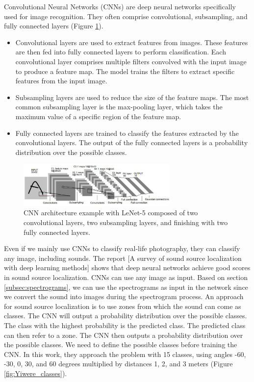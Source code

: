 Convolutional Neural Networks (CNNs)\cite{oshea2015introduction} are deep neural networks specifically used for image recognition. They often comprise convolutional, subsampling, and fully connected layers (Figure \ref*{fig:cnn_example}).
\begin{itemize}
    \item{} Convolutional layers are used to extract features from images. These features are then fed into fully connected layers to perform classification. Each convolutional layer comprises multiple filters convolved with the input image to produce a feature map. The model trains the filters to extract specific features from the input image.
    \item{} Subsampling layers are used to reduce the size of the feature maps. The most common subsampling layer is the max-pooling layer, which takes the maximum value of a specific region of the feature map.
    \item{} Fully connected layers are trained to classify the features extracted by the convolutional layers. The output of the fully connected layers is a probability distribution over the possible classes. 
\end{itemize}

\begin{figure}[H]
    \centering
    \includegraphics[width=0.7\textwidth]{../Images/cnn_example.png}
    \caption{CNN architecture example with LeNet-5 \protect\cite{726791} composed of two convolutional layers, two subsampling layers, and finishing with two fully connected layers.}
    \label{fig:cnn_example}
\end{figure}

Even if we mainly use CNNs to classify real-life photography, they can classify any image, including sounds. The report [A survey of sound source localization with deep learning methods]\cite{Grumiaux_2022} shows that deep neural networks achieve good scores in sound source localization. CNNs can use any image as input. Based on section \ref*{subsec:spectrograms}, we can use the spectrograms as input in the network since we convert the sound into images during the spectrogram process. An approach for sound source localization is to use zones from which the sound can come as classes. The CNN will output a probability distribution over the possible classes. The class with the highest probability is the predicted class. The predicted class can then refer to a zone. The CNN then outputs a probability distribution over the possible classes. We need to define the possible classes before training the CNN. In this work\cite{s20010172}, they approach the problem with 15 classes, using angles -60, -30, 0, 30, and 60 degrees multiplied by distances 1, 2, and 3 meters (Figure \ref*{fig:Yiwere_classes}).


